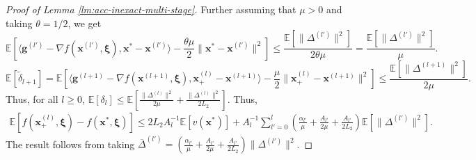 \documentclass[11pt,fullpage,letterpaper]{article}
\newcommand{\mc}{\mathcal}
\newcommand{\mb}{\mathbf}
\newcommand{\R}{\mathbb{R}}
\newcommand{\E}{\mathbb{E}}
\newcommand{\proj}{\mathsf{P}}
\newcommand{\bx}{\boldsymbol{\xi}}
\begin{document}
\begin{proof}[Proof of Lemma \ref{lm:acc-inexact-multi-stage}]
Further assuming that $\mu>0$ and taking $\theta = 1/2$, we get
\begin{displaymath}
    \E[\langle \mb g^{(l')}-\nabla f(\mb x^{(l')},\bx),\mb x^*-\mb x^{(l')}\rangle-\frac{\theta \mu}{2}\|\mb x^* - \mb x^{(l')}\|^2] \leq \frac{\E[\|\Delta^{(l')}\|^2]}{2\theta\mu}=\frac{\E[\|\Delta^{(l')}\|^2]}{\mu}.
\end{displaymath}
\begin{displaymath}
    \E[\tilde{\delta}_{l+1}] = \E[\langle \mb g^{(l+1)} - \nabla f(\mb x^{(l+1)},\bx) ,\mb x_+^{(l)}-\mb x^{(l+1)}\rangle-\frac{\mu}{2}\|\mb x_+^{(l)} - \mb x^{(l+1)}\|^2]\leq \frac{\E[\|\Delta^{(l+1)}\|^2]}{2\mu}.
\end{displaymath}
Thus, for all $l\geq 0$, $\E[\delta_l ]\leq \E[\frac{\|\Delta^{(l)}\|^2}{2\mu} + \frac{\|\Delta^{(l)}\|^2}{2L_2}]$. 
Thus, 
\begin{align*}
    \E[f(\mb x_+^{(l)},\bx) - f(\mb x^*,\bx)]\leq2L_2A_l^{-1}\E[v(\mb x^*)]+ A_l^{-1}\sum_{l'=0}^l (\frac{\alpha_{l'}}{\mu} + \frac{A_{l'}}{2\mu}+\frac{A_{l'}}{2L_2})\E[\|\Delta^{(l')}\|^2 ].
\end{align*}
The result follows from taking $\overline{\Delta}^{(l')} =(\frac{\alpha_{l'}}{\mu} + \frac{A_{l'}}{2\mu}+\frac{A_{l'}}{2L_2})\|\Delta^{(l')}\|^2 $. 
\end{proof}






\end{document}
